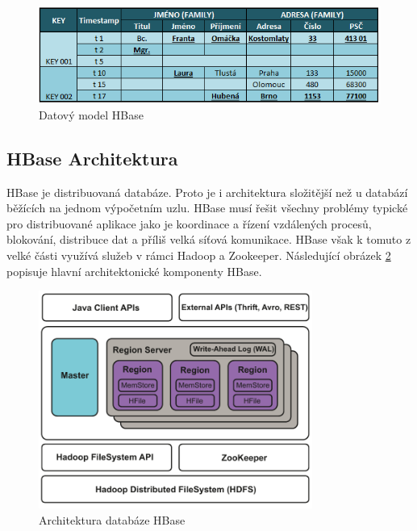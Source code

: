 \documentclass[thesis=M,czech]{FITthesis}[2012/06/26]
\begin{document}
\begin{figure}\centering
	\includegraphics[width=1\textwidth, angle=0]{files/hbase}
	\caption[Datový model HBase]{Datový model HBase}\label{fig:hbase}
\end{figure}

\subsection{HBase Architektura}
HBase je distribuovaná databáze. Proto je i architektura složitější než u databází běžících na jednom výpočetním uzlu. HBase musí řešit všechny problémy typické pro distribuované aplikace jako je koordinace a řízení vzdálených procesů, blokování, distribuce dat a příliš velká síťová komunikace. HBase však k tomuto z velké části využívá služeb v rámci Hadoop a Zookeeper. Následující obrázek \ref{fig:hbasearch} popisuje hlavní architektonické komponenty HBase.
\begin{figure}\centering
	\includegraphics[width=0.8\textwidth, angle=0]{files/hbase-architecture}
	\caption[Architektura databáze HBase]{Architektura databáze HBase}\label{fig:hbasearch}
\end{figure}
\end{document}
